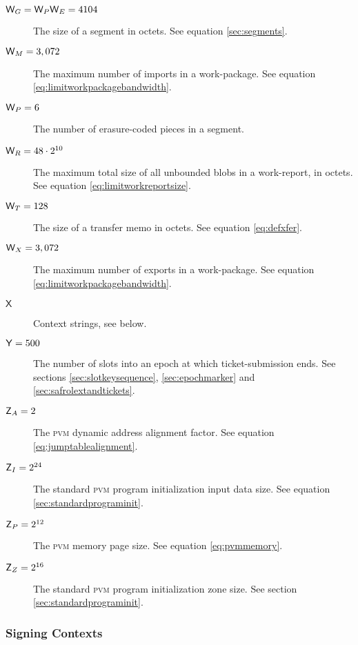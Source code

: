 \begin{description}
  \item[$\mathsf{W}_G = \mathsf{W}_P\mathsf{W}_E = 4104$] The size of a segment in octets. See equation \ref{sec:segments}.
  \item[$\mathsf{W}_M = 3,072$] The maximum number of imports in a work-package. See equation \ref{eq:limitworkpackagebandwidth}.
  \item[$\mathsf{W}_P = 6$] The number of erasure-coded pieces in a segment.
  \item[$\mathsf{W}_R = 48\cdot2^{10}$] The maximum total size of all unbounded blobs in a work-report, in octets. See equation \ref{eq:limitworkreportsize}.
  \item[$\mathsf{W}_T = 128$] The size of a transfer memo in octets. See equation \ref{eq:defxfer}.
  \item[$\mathsf{W}_X = 3,072$] The maximum number of exports in a work-package. See equation \ref{eq:limitworkpackagebandwidth}.
  \item[$\mathsf{X}$] Context strings, see below.
  \item[$\mathsf{Y} = 500$] The number of slots into an epoch at which ticket-submission ends. See sections \ref{sec:slotkeysequence}, \ref{sec:epochmarker} and \ref{sec:safrolextandtickets}.
  \item[$\mathsf{Z}_A = 2$] The \textsc{pvm} dynamic address alignment factor. See equation \ref{eq:jumptablealignment}.
  \item[$\mathsf{Z}_I = 2^{24}$] The standard \textsc{pvm} program initialization input data size. See equation \ref{sec:standardprograminit}.
  \item[$\mathsf{Z}_P = 2^{12}$] The \textsc{pvm} memory page size. See equation \ref{eq:pvmmemory}.
  \item[$\mathsf{Z}_Z = 2^{16}$] The standard \textsc{pvm} program initialization zone size. See section \ref{sec:standardprograminit}.
\end{description}

\subsubsection{Signing Contexts}

